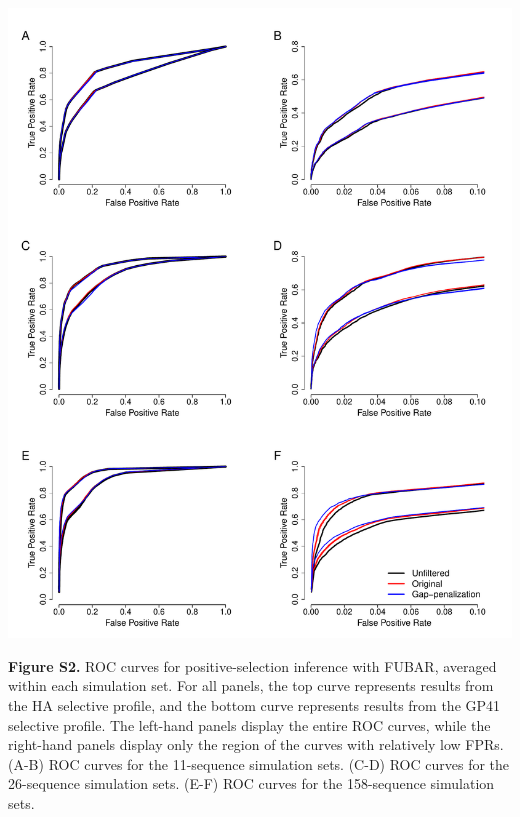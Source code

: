 \documentclass[11pt]{article}
\begin{document}
\newpage
\centerline{\includegraphics[width=6.25in]{Figures/ROC_SI_fubar.pdf}}
\noindent \textbf{Figure S2.} ROC curves for positive-selection inference with FUBAR, averaged within each simulation set. For all panels, the top curve represents results from the HA selective profile, and the bottom curve represents results from the GP41 selective profile. The left-hand panels display the entire ROC curves, while the right-hand panels display only the region of the curves with relatively low FPRs.  (A-B) ROC curves for the 11-sequence simulation sets. (C-D) ROC curves for the 26-sequence simulation sets. (E-F) ROC curves for the 158-sequence simulation sets.
\end{document}
